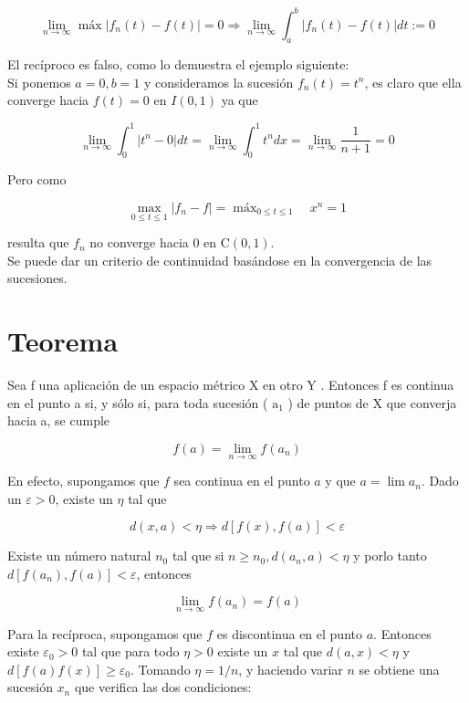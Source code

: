 \documentclass[10pt]{article}
\theoremstyle{plain}
\theoremstyle{definition}
\theoremstyle{remark}
\begin{document}
$$
\lim _{n \rightarrow \infty} \operatorname{máx}\left|f_{n}(t)-f(t)\right|=0 \Rightarrow \lim _{n \rightarrow \infty} \int_{a}^{b}\left|f_{n}(t)-f(t)\right| d t:=0
$$

El recíproco es falso, como lo demuestra el ejemplo siguiente:\\
Si ponemos $a=0, b=1$ y consideramos la sucesión $f_{n}(t)=t^{n}$, es claro que ella converge hacia $f(t)=0$ en $I(0,1)$ ya que

$$
\lim _{n \rightarrow \infty} \int_{0}^{1}\left|t^{n}-0\right| d t=\lim _{n \rightarrow \infty} \int_{0}^{1} t^{n} d x=\lim _{n \rightarrow \infty} \frac{1}{n+1}=0
$$

Pero como

$$
\max _{0 \leqslant t \leqslant 1}\left|f_{n}-f\right|=\operatorname{máx}_{0 \leqslant t \leqslant 1} \quad x^{n}=1
$$

resulta que $f_{n}$ no converge hacia 0 en $\mathrm{C}(0,1)$.\\
Se puede dar un criterio de continuidad basándose en la convergencia de las sucesiones.

\section*{Teorema}
Sea f una aplicación de un espacio métrico X en otro Y . Entonces f es continua en el punto a si, y sólo si, para toda sucesión ( $\mathrm{a}_{1}$ ) de puntos de X que converja hacia a, se cumple

$$
f(a)=\lim _{n \rightarrow \infty} f\left(a_{n}\right)
$$

En efecto, supongamos que $f$ sea continua en el punto $a$ y que $a=\lim a_{n}$. Dado un $\varepsilon>0$, existe un $\eta$ tal que

$$
d(x, a)<\eta \Rightarrow d[f(x), f(a)]<\varepsilon
$$

Existe un número natural $n_{0}$ tal que si $n \geqslant n_{0}, d\left(a_{n}, a\right)<\eta$ y porlo tanto $d\left[f\left(a_{n}\right), f(a)\right]<\varepsilon$, entonces

$$
\lim _{n \rightarrow \infty} f\left(a_{n}\right)=f(a)
$$

Para la recíproca, supongamos que $f$ es discontinua en el punto $a$. Entonces existe $\varepsilon_{0}>0$ tal que para todo $\eta>0$ existe un $x$ tal que $d(a, x)<\eta$ y $d[f(a) f(x)] \geqslant \varepsilon_{0}$. Tomando $\eta=1 / n$, y haciendo variar $n$ se obtiene una sucesión $x_{n}$ que verifica las dos condiciones:
\end{document}
